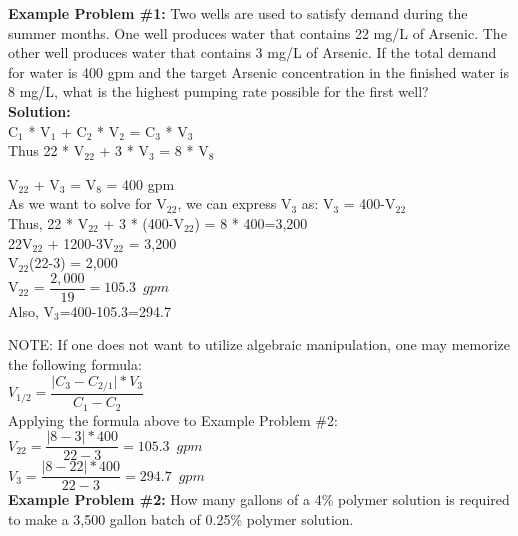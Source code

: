 \documentclass{article}
\begin{document}
\textbf{Example Problem \#1:} Two wells are used to satisfy demand during the summer months. One well produces water that contains 22 mg/L of Arsenic. The other well produces water that contains 3 mg/L of Arsenic. If the total demand for water is 400 gpm and the target Arsenic concentration in the finished water is 8 mg/L, what is the highest pumping rate possible for the first well?\\
\vspace{0.3cm}
\textbf{Solution:}\\
C$_1$ * V$_1$ + C$_2$ * V$_2$ =  C$_3$ * V$_3$\\
\vspace{0.3cm}
Thus 22 * V$_{22}$ + 3 * V$_3$ =  8 * V$_8$\\
\vspace{0.3cm}

V$_{22}$ + V$_3$ = V$_8$ = 400 gpm\\
\vspace{0.3cm}
As we want to solve for V$_{22}$, we can express V$_3$ as: V$_3$ = 400-V$_{22}$\\
\vspace{0.3cm}
Thus, 22 * V$_{22}$ + 3 * (400-V$_{22}$) =  8 * 400=3,200\\
\vspace{0.3cm}
22V$_{22}$ + 1200-3V$_{22}$ =  3,200\\
\vspace{0.3cm}
V$_{22}$(22-3) =  2,000\\
\vspace{0.3cm}
V$_{22}$ = $ \dfrac{2,000}{19}=\boxed{105.3 \enspace gpm}$\\
\vspace{0.3cm}
Also, V$_3$=400-105.3=294.7\\
\vspace{0.3cm}

NOTE:  If one does not want to utilize algebraic manipulation, one may memorize the following formula:\\
\vspace{0.3cm}
$V_{1/2}=\dfrac{\lvert C_3 - C_{2/1}\rvert*V_3}{C_1-C_2}$\\
\vspace{0.3cm}
Applying the formula above to Example Problem \#2:\\
\vspace{0.3cm}
$V_{22}=\dfrac{\lvert 8 - 3\rvert*400}{22-3}=\boxed{105.3 \enspace gpm}$\\
\vspace{0.3cm}
$V_{3}=\dfrac{\lvert 8 - 22\rvert*400}{22-3}=\boxed{294.7 \enspace gpm}$\\
\vspace{0.3cm}
\textbf{Example Problem \#2:}  How many gallons of a 4\% polymer solution is required to make a 3,500 gallon batch of 0.25\% polymer solution.\\
\end{document}
